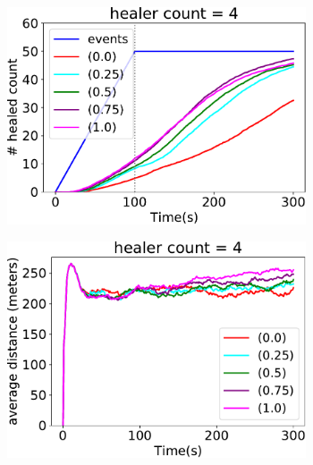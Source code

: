 \documentclass[jsan,article,accept,moreauthors,pdftex]{Definitions/mdpi}
\begin{document}
\begin{figure}[H]
\begin{subfigure}[b]{0.32\textwidth}
\end{subfigure}
\par\bigskip %
\centering
\begin{subfigure}[b]{0.32\textwidth}
\centering
\includegraphics[width=0.97\textwidth]{imgs/healed-4.pdf}
\end{subfigure}
\hfill
%
\begin{subfigure}[b]{0.32\textwidth}
\centering
\includegraphics[width=0.97\textwidth]{imgs/avg-distance-from-leader-4.pdf}
\end{subfigure}
\hfill
%
\begin{subfigure}[b]{0.32\textwidth}
\centering

\end{subfigure}
\end{figure}
\end{document}
